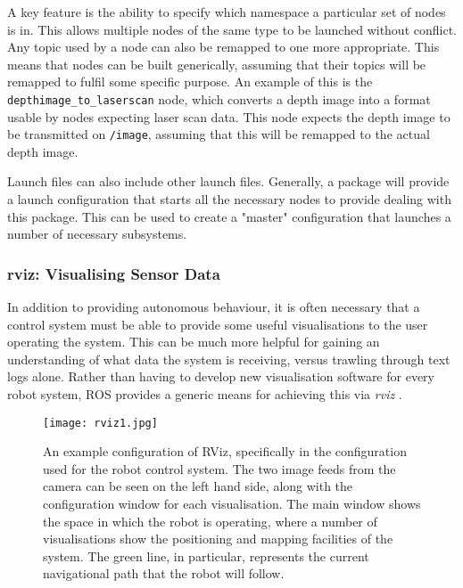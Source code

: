 A key feature is the ability to specify which namespace a particular set of nodes is in. This allows multiple nodes of the same type to be launched without conflict. Any topic used by a node can also be remapped to one more appropriate. This means that nodes can be built generically, assuming that their topics will be remapped to fulfil some specific purpose. An example of this is the \texttt{depthimage\_to\_laserscan} node, which converts a depth image into a format usable by nodes expecting laser scan data. This node expects the depth image to be transmitted on \texttt{/image}, assuming that this will be remapped to the actual depth image.

Launch files can also include other launch files. Generally, a package will provide a launch configuration that starts all the necessary nodes to provide dealing with this package. This can be used to create a "master" configuration that launches a number of necessary subsystems.

\subsubsection{rviz: Visualising Sensor Data}

In addition to providing autonomous behaviour, it is often necessary that a control system must be able to provide some useful visualisations to the user operating the system. This can be much more helpful for gaining an understanding of what data the system is receiving, versus trawling through text logs alone. Rather than having to develop new visualisation software for every robot system, ROS provides a generic means for achieving this via \emph{rviz} \cite{ros_wiki_rviz}.

\begin{figure}[t]
    \centering
    \texttt{[image: rviz1.jpg]}
    \caption{An example configuration of RViz, specifically in the configuration used for the robot control system. The two image feeds from the camera can be seen on the left hand side, along with the configuration window for each visualisation. The main window shows the space in which the robot is operating, where a number of visualisations show the positioning and mapping facilities of the system. The green line, in particular, represents the current navigational path that the robot will follow.}
    \label{fig:rviz}
\end{figure}

